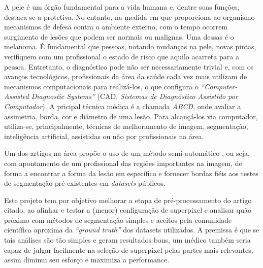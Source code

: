 A pele é um órgão fundamental para a vida humana e, dentre suas funções, destaca-se a protetiva.
No entanto, na medida em que proporciona ao organismo mecanismos de defesa contra o ambiente externo,
com o tempo ocorrem surgimento de lesões que podem ser normais ou malignas. Uma dessas é o melanoma.
É fundamental que pessoas, notando mudanças na pele, novas pintas, verifiquem com um profissional o
estado de risco que aquilo acarreta para a pessoa. Entretanto, o diagnóstico pode não ser necessariamente
trivial e, com os avanços tecnológicos, profissionais da área da saúde cada vez mais utilizam de mecanismos
computacionais para realizá-los, o que configura o \emph{``Computer-Assisted Diagnostic Systems''} (CAD, \emph{Sistemas de Diagnóstico Assistido por Computador}). A pricipal técnica médica é a chamada \emph{ABCD}, onde avaliar a assimetria, borda, cor e diâmetro de uma lesão. Para alcançá-los via computador, utiliza-se, principalmente, técnicas de melhoramento de imagem, segmentação, inteligência artificial, assistidas ou não por profissionais na área.

Um dos artigos na área propõe o uso de um método semi-automático \cite{santos2020skin}, ou seja, com apontamento de um profissional das regiões importantes na imagem, de forma a encontrar a forma da lesão em específico e fornecer bordas fiéis aos testes de segmentação pré-existentes em \textit{datasets} públicos.

Este projeto tem por objetivo melhorar a etapa de pré-processamento do artigo \cite{santos2020skin} citado,
ao alinhar e testar a (menor) configuração de superpixel e analisar quão próximo com métodos de segmentação
simples e aceitos pela comunidade científica aproxima da \emph{``ground truth''} dos datasets utilizados. A
premissa é que se tais análises são tão simples e geram resultados bons, um médico também seria capaz de julgar
facilmente na seleção de superpixel pelas partes mais relevantes, assim diminui seu esforço e maximiza a performance.
